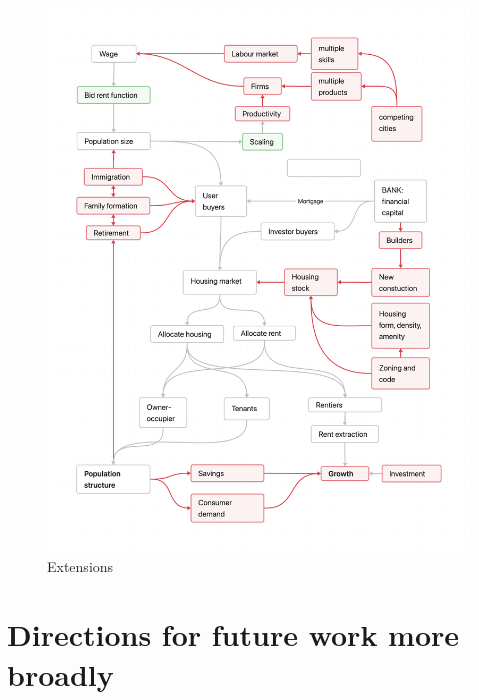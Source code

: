 {\newpage\thispagestyle{empty}
\vspace{-1.5cm}
\begin{figure}
\vspace{-4.5cm}
\begin{adjustwidth}{-0.24\textwidth}{-0.2\textwidth}
\centering
\includegraphics[scale=.22]{fig/extensions-logic.png}
\end{adjustwidth}
\caption{Extensions}
\label{fig-extensions-logic}
\end{figure}}




\section{Directions for future work more broadly}


